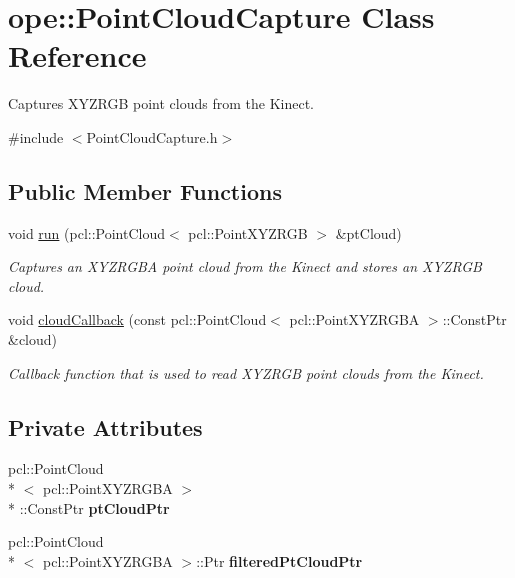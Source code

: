 \hypertarget{classope_1_1_point_cloud_capture}{\section{ope\-:\-:Point\-Cloud\-Capture Class Reference}
\label{classope_1_1_point_cloud_capture}
}


Captures X\-Y\-Z\-R\-G\-B point clouds from the Kinect.  




{\ttfamily \#include $<$Point\-Cloud\-Capture.\-h$>$}

\subsection*{Public Member Functions}
\begin{DoxyCompactItemize}
\item 
void \hyperlink{classope_1_1_point_cloud_capture_a21c28f5e4d669de00187741d0e9c7e6f}{run} (pcl\-::\-Point\-Cloud$<$ pcl\-::\-Point\-X\-Y\-Z\-R\-G\-B $>$ \&pt\-Cloud)
\begin{DoxyCompactList}\small\item\em Captures an X\-Y\-Z\-R\-G\-B\-A point cloud from the Kinect and stores an X\-Y\-Z\-R\-G\-B cloud. \end{DoxyCompactList}\item 
\hypertarget{classope_1_1_point_cloud_capture_ac23a878e95bc7a5d40ce95d919eab8d6}{void \hyperlink{classope_1_1_point_cloud_capture_ac23a878e95bc7a5d40ce95d919eab8d6}{cloud\-Callback} (const pcl\-::\-Point\-Cloud$<$ pcl\-::\-Point\-X\-Y\-Z\-R\-G\-B\-A $>$\-::Const\-Ptr \&cloud)}\label{classope_1_1_point_cloud_capture_ac23a878e95bc7a5d40ce95d919eab8d6}

\begin{DoxyCompactList}\small\item\em Callback function that is used to read X\-Y\-Z\-R\-G\-B point clouds from the Kinect. \end{DoxyCompactList}\end{DoxyCompactItemize}
\subsection*{Private Attributes}
\begin{DoxyCompactItemize}
\item 
\hypertarget{classope_1_1_point_cloud_capture_a2cd811475d75d32c6cd0cd33cf728567}{pcl\-::\-Point\-Cloud\\*
$<$ pcl\-::\-Point\-X\-Y\-Z\-R\-G\-B\-A $>$\\*
\-::Const\-Ptr {\bfseries pt\-Cloud\-Ptr}}\label{classope_1_1_point_cloud_capture_a2cd811475d75d32c6cd0cd33cf728567}

\item 
\hypertarget{classope_1_1_point_cloud_capture_add3d670a69bec191b3c3c0552b9d7223}{pcl\-::\-Point\-Cloud\\*
$<$ pcl\-::\-Point\-X\-Y\-Z\-R\-G\-B\-A $>$\-::Ptr {\bfseries filtered\-Pt\-Cloud\-Ptr}}\label{classope_1_1_point_cloud_capture_add3d670a69bec191b3c3c0552b9d7223}

\end{DoxyCompactItemize}


